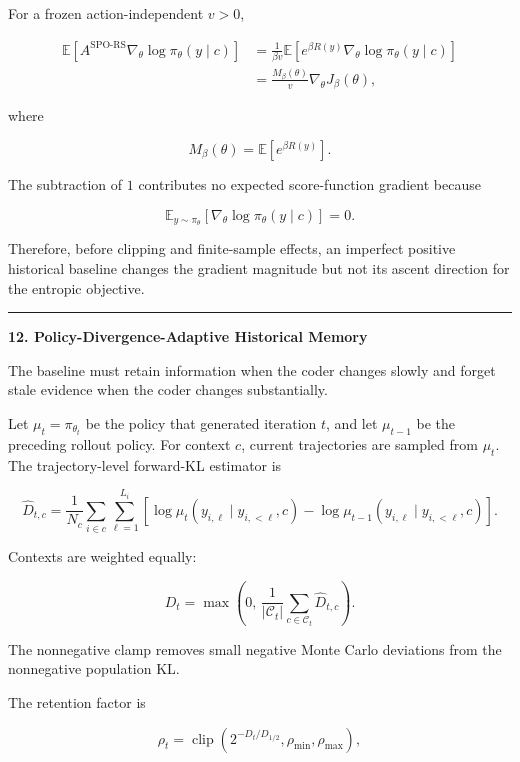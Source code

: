 \documentclass[
]{article}
\begin{document}
For a frozen action-independent \(v>0\),

\[
\begin{aligned}
\mathbb{E}
\left[
A^{\mathrm{SPO\text{-}RS}}
\nabla_\theta\log\pi_\theta(y\mid c)
\right]
&=
\frac{1}{\beta v}
\mathbb{E}
\left[
e^{\beta R(y)}
\nabla_\theta\log\pi_\theta(y\mid c)
\right]\\
&=
\frac{M_\beta(\theta)}{v}
\nabla_\theta J_\beta(\theta),
\end{aligned}
\]

where

\[
M_\beta(\theta)=\mathbb{E}[e^{\beta R(y)}].
\]

The subtraction of \(1\) contributes no expected score-function gradient
because

\[
\mathbb{E}_{y\sim\pi_\theta}
[
\nabla_\theta\log\pi_\theta(y\mid c)
]=0.
\]

Therefore, before clipping and finite-sample effects, an imperfect
positive historical baseline changes the gradient magnitude but not its
ascent direction for the entropic objective.

\begin{center}\rule{0.5\linewidth}{0.5pt}\end{center}

\textbf{12. Policy-Divergence-Adaptive Historical Memory}

The baseline must retain information when the coder changes slowly and
forget stale evidence when the coder changes substantially.

Let \(\mu_t=\pi_{\theta_t}\) be the policy that generated iteration
\(t\), and let \(\mu_{t-1}\) be the preceding rollout policy. For
context \(c\), current trajectories are sampled from \(\mu_t\). The
trajectory-level forward-KL estimator is

\[
\widehat D_{t,c}
=
\frac{1}{N_c}
\sum_{i\in c}
\sum_{\ell=1}^{L_i}
\left[
\log\mu_t(y_{i,\ell}\mid y_{i,<\ell},c)
-
\log\mu_{t-1}(y_{i,\ell}\mid y_{i,<\ell},c)
\right].
\]

Contexts are weighted equally:

\[
D_t
=
\max\left(
0,\,
\frac{1}{|\mathcal C_t|}
\sum_{c\in\mathcal C_t}
\widehat D_{t,c}
\right).
\]

The nonnegative clamp removes small negative Monte Carlo deviations from
the nonnegative population KL.

The retention factor is

\[
\rho_t
=
\operatorname{clip}
\left(
2^{-D_t/D_{1/2}},
\rho_{\min},
\rho_{\max}
\right),
\]
\end{document}
